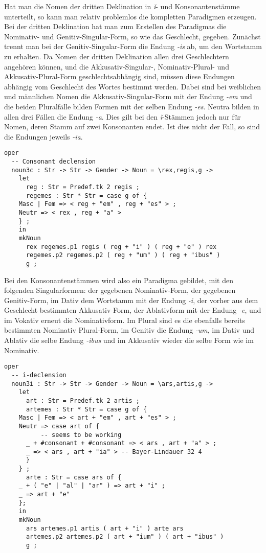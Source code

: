 Hat man die Nomen der dritten Deklination in \textit{ǐ}- und Konsonantenstämme unterteilt, so kann man relativ problemlos die kompletten Paradigmen erzeugen. Bei der dritten Deklination hat man zum Erstellen des Paradigmas die Nominativ- und Genitiv-Singular-Form, so wie das Geschlecht, gegeben. Zunächst trennt man bei der Genitiv-Singular-Form die Endung \textit{-is} ab, um den Wortstamm zu erhalten. Da Nomen der dritten Deklination allen drei Geschlechtern angehören können, und die Akkusativ-Singular-, Nominativ-Plural- und Akkusativ-Plural-Form geschlechtsabhängig sind, müssen diese Endungen abhängig vom Geschlecht des Wortes bestimmt werden. Dabei sind bei weiblichen und männlichen Nomen die Akkusativ-Singular-Form mit der Endung \textit{-em} und die beiden Pluralfälle bilden Formen mit der selben Endung \textit{-es}. Neutra bilden in allen drei Fällen die Endung \textit{-a}. Dies gilt bei den \textit{ǐ}-Stämmen jedoch nur für Nomen, deren Stamm auf zwei Konsonanten endet. Ist dies nicht der Fall, so sind die Endungen jeweils \textit{-ia}. \par
\begin{lstlisting}[float=h!tp,caption={Die Deklinationsfunktionen für die Nomen der dritten Deklination der Konsonantenstämme},label={GF-Morpho-Noun3c},basicstyle=\small]
oper
  -- Consonant declension
  noun3c : Str -> Str -> Gender -> Noun = \rex,regis,g ->
    let
      reg : Str = Predef.tk 2 regis ;
      regemes : Str * Str = case g of {
	Masc | Fem => < reg + "em" , reg + "es" > ;
	Neutr => < rex , reg + "a" > 
	} ;
    in
    mkNoun
      rex regemes.p1 regis ( reg + "i" ) ( reg + "e" ) rex
      regemes.p2 regemes.p2 ( reg + "um" ) ( reg + "ibus" ) 
      g ;
\end{lstlisting}
Bei den Konsonantenstämmen wird also ein Paradigma gebildet, mit den folgenden Singularformen: der gegebenen Nominativ-Form, der gegebenen Genitiv-Form, im Dativ dem Wortstamm mit der Endung \textit{-i}, der vorher aus dem Geschlecht bestimmten Akkusativ-Form, der Ablativform mit der Endung \textit{-e}, und im Vokativ erneut die Nominativform. Im Plural sind es die ebenfalls bereits bestimmten Nominativ Plural-Form, im Genitiv die Endung \textit{-um}, im Dativ und Ablativ die selbe Endung \textit{-ibus} und im Akkusativ wieder die selbe Form wie im Nominativ. \par
\begin{lstlisting}[float=h!tp,caption={Die Deklinationsfunktionen für die Nomen der dritten Deklination der \textit{ǐ}-Stämme},label={GF-Morpho-Noun3i},basicstyle=\small]
oper
  -- i-declension
  noun3i : Str -> Str -> Gender -> Noun = \ars,artis,g ->
    let 
      art : Str = Predef.tk 2 artis ;
      artemes : Str * Str = case g of {
	Masc | Fem => < art + "em" , art + "es" > ;
	Neutr => case art of {
          -- seems to be working
	  _ + #consonant + #consonant => < ars , art + "a" > ; 
	  _ => < ars , art + "ia" > -- Bayer-Lindauer 32 4
	  }
	} ;
      arte : Str = case ars of {
	_ + ( "e" | "al" | "ar" ) => art + "i" ;
	_ => art + "e"
	};
    in
    mkNoun
      ars artemes.p1 artis ( art + "i" ) arte ars
      artemes.p2 artemes.p2 ( art + "ium" ) ( art + "ibus" ) 
      g ;
\end{lstlisting}

